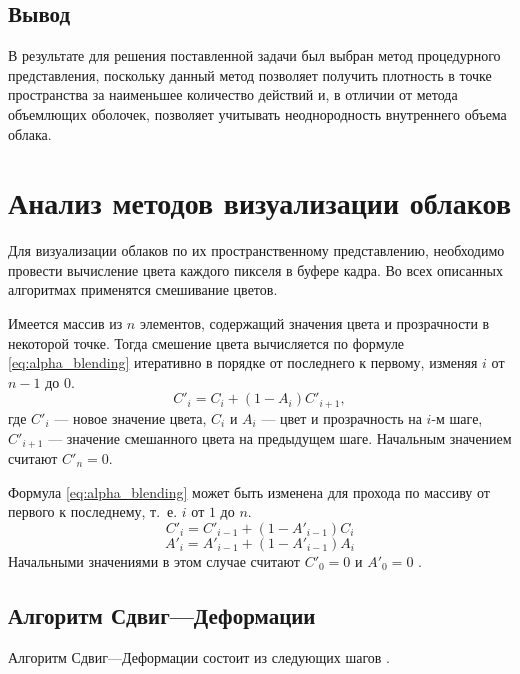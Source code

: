 \subsection*{Вывод}
В результате для решения поставленной задачи был выбран метод процедурного представления, поскольку данный метод позволяет получить плотность в точке пространства за наименьшее количество действий и, в отличии от метода объемлющих оболочек, позволяет учитывать неоднородность внутреннего объема облака.


\section{Анализ методов визуализации облаков}

Для визуализации облаков по их пространственному представлению, необходимо провести вычисление цвета каждого пикселя в буфере кадра. Во всех описанных алгоритмах применятся смешивание цветов. 

Имеется массив из $n$ элементов, содержащий значения цвета и прозрачности в некоторой точке. Тогда смешение цвета вычисляется по формуле \eqref{eq:alpha_blending} итеративно в порядке от последнего к первому, изменяя $i$ от $n-1$ до $0$.
\begin{equation}
	\label{eq:alpha_blending}
	C'_i = C_i + (1 - A_i)C'_{i+1},
\end{equation}
где $C'_i$ --- новое значение цвета, $C_i$ и $A_i$ --- цвет и прозрачность на $i$-м шаге, $C'_{i+1}$ --- значение смешанного цвета на предыдущем шаге. Начальным значением считают $C'_n = 0$.

Формула \eqref{eq:alpha_blending} может быть изменена для прохода по массиву от первого к последнему, т.~е. $i$ от $1$ до $n$.
\begin{equation}
	\label{eq:color_blending_for}
	C'_i = C'_{i - 1} + (1 - A'_{i - 1})C_{i}
\end{equation}
\begin{equation}
	\label{eq:alpha_blending_for}
	A'_i = A'_{i - 1} + (1 - A'_{i - 1})A_{i}
\end{equation}
Начальными значениями в этом случае считают $C'_0 = 0$ и $A'_0=0$ \cite{rtvg}.


\subsection{Алгоритм Сдвиг---Деформации}
\label{slice}

Алгоритм Сдвиг---Деформации состоит из следующих шагов \cite{shearwarp}.

